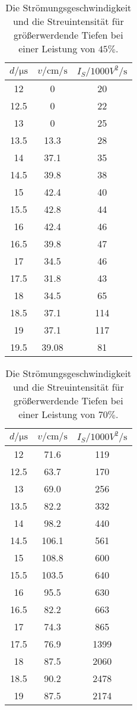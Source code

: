\begin{table}[H]
    \centering
    \caption{Die Strömungsgeschwindigkeit und die Streuintensität für größerwerdende Tiefen bei einer Leistung von $45 \%$.}
    \label{tab:sp1}
\begin{tabular}{c c c}
    \toprule
    $d / \si{\micro\second}$ & $ v / \si{\centi \meter \per \second}$ & $I_S / 1000 \si{ V^2 \per \second} $\\
    \midrule
      12 &     0 &  20 \\
    12.5 &     0 &  22 \\
      13 &     0 &  25 \\
    13.5 &  13.3 &  28 \\
      14 &  37.1 &  35 \\
    14.5 &  39.8 &  38 \\
      15 &  42.4 &  40 \\
    15.5 &  42.8 &  44 \\
      16 &  42.4 &  46 \\
    16.5 &  39.8 &  47 \\
      17 &  34.5 &  46 \\
    17.5 &  31.8 &  43 \\
      18 &  34.5 &  65 \\
    18.5 &  37.1 & 114 \\
      19 &  37.1 & 117 \\
    19.5 & 39.08 &  81 \\
    \bottomrule
    \end{tabular}
\end{table}

\begin{table}[H]
    \centering
    \caption{Die Strömungsgeschwindigkeit und die Streuintensität für größerwerdende Tiefen bei einer Leistung von $70 \%$.}
    \label{tab:sp2}
\begin{tabular}{c c c}
    \toprule
    $d / \si{\micro\second}$ & $ v / \si{\centi \meter \per \second}$ & $I_S / 1000 \si{ V^2 \per \second} $\\
    \midrule
      12 &   71.6 &  119 \\
    12.5 &   63.7 &  170 \\
      13 &   69.0 &  256 \\
    13.5 &  82.2 &  332 \\
      14 &  98.2 &  440 \\
    14.5 &  106.1 &  561 \\
      15 &  108.8 &  600 \\
    15.5 &  103.5 &  640 \\
      16 &  95.5 &  630 \\
    16.5 &  82.2 &  663 \\
      17 &  74.3 &  865 \\
    17.5 &  76.9 &  1399 \\
      18 &  87.5 &  2060 \\
    18.5 &  90.2 & 2478 \\
      19 &  87.5 & 2174 \\
    \bottomrule
    \end{tabular}
\end{table}

